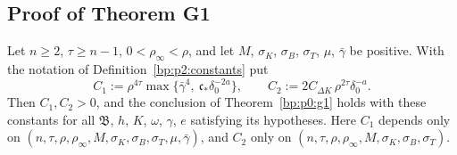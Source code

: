 \subsection{Proof of Theorem G1}\label{bp:p2:sec-proof}

\begin{theorem}\label{bp:p2:g1}
Let $n\ge2$, $\tau\ge n-1$, $0<\rho_\infty<\rho$, and let $M$, $\sigma_K$, $\sigma_B$, $\sigma_T$, $\mu$,
$\bar\gamma$ be positive. With the notation of Definition~\ref{bp:p2:constants} put
\[
C_1:=\rho^{4\tau}\max\bigl\{\bar\gamma^4,\ \mathfrak c_*\delta_0^{-2a}\bigr\},\qquad
C_2:=2C_{\Delta K}\,\rho^{2\tau}\delta_0^{-a}.
\]
Then $C_1,C_2>0$, and the conclusion of Theorem~\ref{bp:p0:g1} holds with these constants for all
$\mathfrak B$, $h$, $K$, $\omega$, $\gamma$, $e$ satisfying its hypotheses. Here $C_1$ depends only on
$(n,\tau,\rho,\rho_\infty,M,\sigma_K,\sigma_B,\sigma_T,\mu,\bar\gamma)$, and $C_2$ only on
$(n,\tau,\rho,\rho_\infty,M,\sigma_K,\sigma_B,\sigma_T)$.
\end{theorem}

